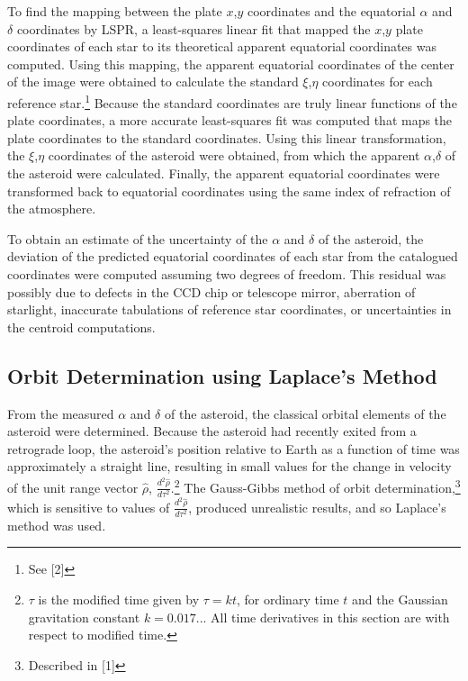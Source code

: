 \documentclass[12pt,journal,compsoc]{IEEEtran}
\begin{document}
To find the mapping between the plate $x$,$y$ coordinates and the equatorial $\alpha$ and $\delta$ coordinates by LSPR, 
a least-squares linear fit that mapped the $x$,$y$ plate coordinates of each star to its 
theoretical apparent equatorial coordinates was computed.
Using this mapping, the apparent equatorial coordinates of the center of the image were obtained 
to calculate the standard $\xi$,$\eta$ coordinates for each reference star.\footnote{See [2]} 
Because the standard coordinates are truly linear functions of the plate coordinates, 
a more accurate least-squares fit was computed that maps the plate coordinates to the standard coordinates.
Using this linear transformation, the $\xi$,$\eta$ coordinates of the asteroid were obtained, 
from which the apparent $\alpha$,$\delta$ of the asteroid were calculated.
Finally, the apparent equatorial coordinates were transformed back to equatorial coordinates 
using the same index of refraction of the atmosphere.

To obtain an estimate of the uncertainty of the $\alpha$ and $\delta$ of the asteroid, 
the deviation of the predicted equatorial coordinates of each star 
from the catalogued coordinates were computed assuming two degrees of freedom.
This residual was possibly due to defects in the CCD chip or telescope mirror, 
aberration of starlight, inaccurate tabulations of reference star coordinates, 
or uncertainties in the centroid computations.

\subsection{Orbit Determination using Laplace's Method}
From the measured $\alpha$ and $\delta$ of the asteroid, 
the classical orbital elements of the asteroid were determined. 
Because the asteroid had recently exited from a retrograde loop,
the asteroid's position relative to Earth as a function of time was approximately a straight line,
resulting in small values for the change in velocity
of the unit range vector $\hat{\rho}$, $\frac{d^2\hat{\rho}}{d\tau^2}$.\footnote{$\tau$ is the modified time given by $\tau=kt$, for ordinary time $t$ 
and the Gaussian gravitation constant $k=0.017...$
All time derivatives in this section are with respect to modified time.}
The Gauss-Gibbs method of orbit determination,\footnote{Described in [1]} which is
sensitive to values of $\frac{d^2\hat{\rho}}{d\tau^2}$, produced unrealistic results, and so Laplace's method was used.
\end{document}
